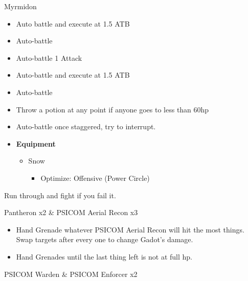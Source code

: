 
\begin{battle}{Myrmidon}
	\begin{itemize}
		\item Auto battle and execute at 1.5 ATB
		\item Auto-battle
		\item Auto-battle 1 Attack
		\item Auto-battle and execute at 1.5 ATB
		\item Auto-battle
		\item Throw a potion at any point if anyone goes to less than 60hp
		\item Auto-battle once staggered, try to interrupt.
	\end{itemize}

\end{battle}


\begin{menu}
	\begin{itemize}
		\item \textbf{Equipment}
		      \begin{itemize}
			      \item Snow
			            \begin{itemize}
				            \item Optimize: Offensive (Power Circle)
			            \end{itemize}
		      \end{itemize}
	\end{itemize}
\end{menu}

Run through and fight if you fail it.

\begin{battle}{Pantheron x2 \& PSICOM Aerial Recon x3}
	\begin{itemize}
		\item Hand Grenade whatever PSICOM Aerial Recon will hit the most things. Swap targets after every one to change Gadot's damage.
		\item Hand Grenades until the last thing left is not at full hp.
	\end{itemize}

\end{battle}

\begin{battle}{PSICOM Warden \& PSICOM Enforcer x2}
\end{battle}


